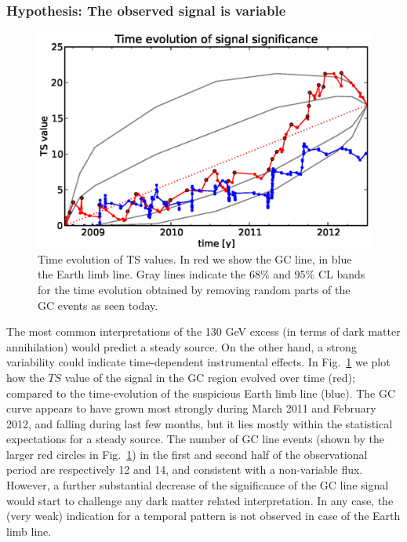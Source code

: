 \documentclass[aps,twocolumn,prd,superscriptaddress,showpacs,nofootinbib,fixfloat]{revtex4}
\begin{document}
\subsubsection{Hypothesis: The observed signal is variable}

\begin{figure}
  \begin{center}
    \includegraphics[width=1.0\linewidth]{plots/TS_time.eps}
  \end{center}
  \caption{Time evolution of TS values. In red we show the
  GC line, in blue the Earth limb line. Gray lines indicate
  the $68\%$ and $95\%$ CL bands for the time evolution
  obtained by removing random parts of the GC events as seen
  today.}
  \label{fig:timeevolution}
\end{figure}

The most common interpretations of the 130 GeV excess (in
terms of dark matter annihilation) would predict a steady
source. On the other hand, a strong variability could
indicate time-dependent instrumental effects. In
Fig.~\ref{fig:timeevolution} we plot how the $TS$ value of
the signal in the GC region evolved over time (red);
compared to the time-evolution of the suspicious Earth limb
line (blue). The GC curve appears to have grown most
strongly during March 2011 and February 2012, and falling
during last few months, but it lies mostly within the
statistical expectations for a steady source. The number of
GC line events (shown by the larger red circles in
Fig.~\ref{fig:timeevolution}) in the first and second half
of the observational period are respectively 12 and 14, and
consistent with a non-variable flux. However, a further
substantial decrease of the significance of the GC line
signal would start to challenge any dark matter related
interpretation.  In any case, the (very weak) indication for
a temporal pattern is not observed in case of the Earth limb
line. 
\end{document}
